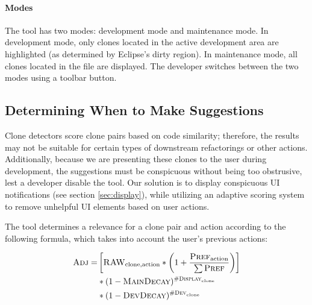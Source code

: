 \documentclass[nocopyrightspace,10pt]{sigplanconf}
\begin{document}
\paragraph{Modes}
The tool has two modes: development mode and maintenance mode. In
development mode, only clones located in the active development area
are highlighted (as determined by Eclipse's dirty region). In
maintenance mode, all clones located in the file are displayed. The
developer switches between the two modes using a toolbar button.

\subsection{Determining When to Make Suggestions}

Clone detectors score clone pairs based on code similarity; therefore,
the results may not be suitable for certain types of downstream
refactorings or other actions.
Additionally,
because we are presenting these clones to the user during development,
the suggestions must be conspicuous without being too obstrusive, lest
a developer disable the tool.
Our solution is to display conspicuous UI notifications
(see section \ref{sec:display}), while utilizing an 
adaptive scoring system to remove unhelpful UI elements based
on user actions.  

The tool determines a relevance for a clone pair and action according
to the following formula, which takes into account the user's previous
actions:

\begin{align*}
  \textsc{Adj} = & \left[ \textsc{RAW}_{\text{clone},\text{action}} * \left(1 + \frac{\textsc{Pref}_{\text{action}}}{\sum{\textsc{Pref}}}\right) \right] \\
      & * (1-\textsc{MainDecay})^{\textsc{\#Display}_{\text{clone}}} \\
      & * (1-\textsc{DevDecay})^{\textsc{\#Dev}_{\text{clone}}} 
\end{align*}
\end{document}
